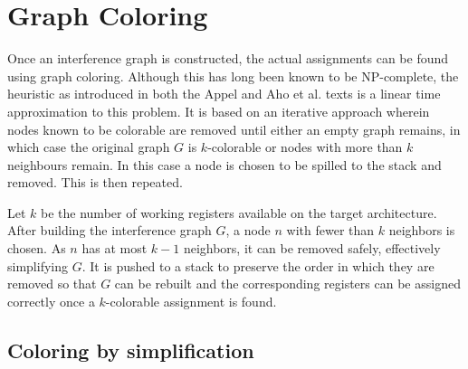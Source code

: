 \documentclass{article}
\begin{document}





\section{Graph Coloring}
Once an interference graph is constructed, the actual assignments can be found using graph coloring. Although this has long been known to be NP-complete, the heuristic as introduced in both the Appel and Aho et al. texts is a linear time approximation to this problem. It is based on an iterative approach wherein nodes known to be colorable are removed until either an empty graph remains, in which case the original graph \(G\) is \(k\)-colorable  or nodes with more than \(k\) neighbours remain. In this case a node is chosen to be spilled to the stack and removed. This is then repeated.

Let \(k\) be the number of working registers available on the target architecture. After building the interference graph \(G\), a node \(n\) with fewer than \(k\) neighbors is chosen. As \(n\) has at most \(k-1\) neighbors, it can be removed safely, effectively simplifying \(G\). It is pushed to a stack to preserve the order in which they are removed so that \(G\) can be rebuilt and the corresponding registers can be assigned correctly once a \(k\)-colorable assignment is found.



\subsection{Coloring by simplification}
\end{document}
